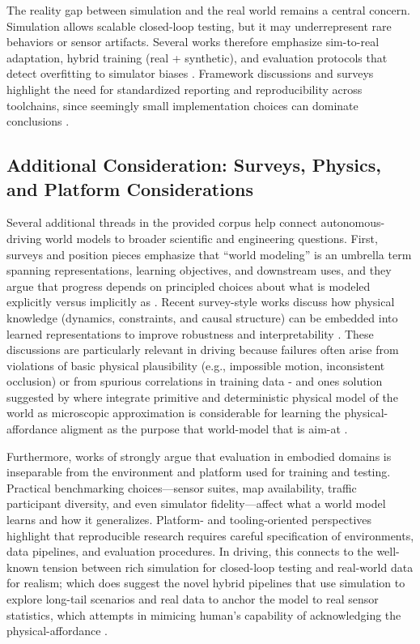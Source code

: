 The reality gap between simulation and the real world remains a central concern. Simulation allows scalable closed-loop testing, but it may underrepresent rare behaviors or sensor artifacts. Several works therefore emphasize sim-to-real adaptation, hybrid training (real + synthetic), and evaluation protocols that detect overfitting to simulator biases \cite{Xu2023,Li2024}. Framework discussions and surveys highlight the need for standardized reporting and reproducibility across toolchains, since seemingly small implementation choices can dominate conclusions \cite{Chen2025,Jia2025}.


\subsection{Additional Consideration: Surveys, Physics, and Platform Considerations}

Several additional threads in the provided corpus help connect autonomous-driving world models to broader scientific and engineering questions. First, surveys and position pieces emphasize that ``world modeling'' is an umbrella term spanning representations, learning objectives, and downstream uses, and they argue that progress depends on principled choices about what is modeled explicitly versus implicitly as \cite{DawidLeCun2024, LeCun2022}. Recent survey-style works discuss how physical knowledge (dynamics, constraints, and causal structure) can be embedded into learned representations to improve robustness and interpretability \cite{Chen2025,Chu2025}. These discussions are particularly relevant in driving because failures often arise from violations of basic physical plausibility (e.g., impossible motion, inconsistent occlusion) or from spurious correlations in training data - and ones solution suggested by \cite{kong_2015_kinematic, sobal_2022_separating} where integrate primitive and deterministic physical model of the world as microscopic approximation is considerable for learning the physical-affordance aligment as the purpose that world-model that is aim-at \cite{gibson_1979_the}.

Furthermore, works of \cite{Brockman2016,Tassa2018,Audinys2025,Bouzaiene2025} strongly argue that evaluation in embodied domains is inseparable from the environment and platform used for training and testing. Practical benchmarking choices—sensor suites, map availability, traffic participant diversity, and even simulator fidelity—affect what a world model learns and how it generalizes. Platform- and tooling-oriented perspectives highlight that reproducible research requires careful specification of environments, data pipelines, and evaluation procedures. In driving, this connects to the well-known tension between rich simulation for closed-loop testing and real-world data for realism; which does suggest the novel hybrid pipelines that use simulation to explore long-tail scenarios and real data to anchor the model to real sensor statistics, which attempts in mimicing human's capability of acknowledging the physical-affordance \cite{gibson_1979_the}. 

